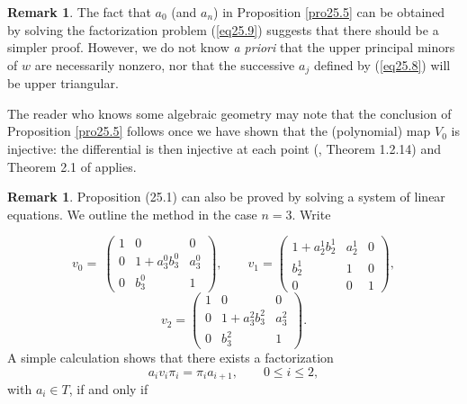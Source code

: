 \documentclass{surv-l}
\theoremstyle{plain}
\theoremstyle{definition}
\newtheorem{remark}[theorem]{Remark}
\numberwithin{equation}{chapter}
\begin{document}
\renewcommand\thetheorem{25.13}
\begin{remark}\label{rem25.13}
The fact that $a_{0}$ (and $a_{n}$) in Proposition \ref{pro25.5} can be obtained by solving the factorization problem (\ref{eq25.9}) suggests that there should be a simpler proof. However, we do not know \emph{a priori} that the upper principal minors of $w$ are necessarily nonzero, nor that the successive $a_{j}$ defined by (\ref{eq25.8}) will be upper triangular.
\end{remark}

The reader who knows some algebraic geometry may note that the conclusion of Proposition \ref{pro25.5} follows once we have shown that the (polynomial) map $V_{0}$ is injective: the differential is then injective at each point (\cite{Ra}, Theorem 1.2.14) and Theorem 2.1 of \cite{BCW} applies.
\renewcommand\thetheorem{25.\arabic{theorem}}
\setcounter{theorem}{13}
\begin{remark}\label{rem25.14}
Proposition (25.1) can also be proved by solving a system of linear equations. We outline the method in the case $n=3$. Write
\end{remark}
\begin{equation*}
v_{0}=\ \left(\begin{array}{ccc}
1 & 0 & 0\\
0 & 1+a_{3}^{0}b_{3}^{0} & a_{3}^{0}\\
0 & b_{3}^{0} & 1
\end{array}\right),\qquad v_{1}=\left(\begin{array}{ccc}
1+a_{2}^{1}b_{2}^{1} & a_{2}^{1} & 0\\
b_{2}^{1} & 1 & 0\\
0 & 0 & 1
\end{array}\right),
\end{equation*}
\begin{equation*}
v_{2}=\left(\begin{array}{ccc}
1 & 0 & 0\\
0 & 1+a_{3}^{2}b_{3}^{2} & a_{3}^{2}\\
0 & b_{3}^{2} & 1
\end{array}\right).
\end{equation*}
A simple calculation shows that there exists a factorization
\begin{equation*}
a_{i}v_{i}\pi_{i}=\pi_{i}a_{i+1},\qquad 0\leq i\leq 2,
\end{equation*}
with $a_{i}\in T$, if and only if
\end{document}
